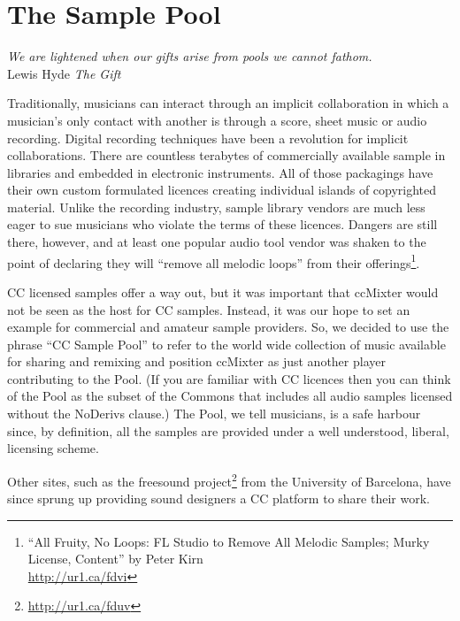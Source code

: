 \section{The Sample Pool}
\label{s:unexpected_collaboration:sample_pool}

\begin{flushright}
\textit{We are lightened when our gifts arise from pools we cannot fathom.}\\
Lewis Hyde \textit{The Gift}
\end{flushright}

Traditionally, musicians can interact through an implicit collaboration in which
a musician's only contact with another is through a score, sheet music or audio
recording. Digital recording techniques have been a revolution for implicit
collaborations. There are countless terabytes of commercially available sample
in libraries and embedded in electronic instruments. All of those packagings
have their own custom formulated licences creating individual islands of
copyrighted material. Unlike the recording industry, sample library vendors are
much less eager to sue musicians who violate the terms of these licences.
Dangers are still there, however, and at least one popular audio tool vendor was
shaken to the point of declaring they will ``remove all melodic loops'' from
their of\hbox{}ferings\footnote{``All Fruity, No Loops: FL Studio to Remove All Melodic
Samples; Murky License, Content'' by Peter Kirn\\
\url{http://ur1.ca/fdvi}}.

CC licensed samples of\hbox{}fer a way out, but it was important that ccMixter would
not be seen as the host for CC samples. Instead, it was our hope to set an
example for commercial and amateur sample providers. So, we decided to use the
phrase ``CC Sample Pool'' to refer to the world wide collection of music
available for sharing and remixing and position ccMixter as just another player
contributing to the Pool. (If you are familiar with CC licences then you can
think of the Pool as the subset of the Commons that includes all audio samples
licensed without the NoDerivs clause.) The Pool, we tell musicians, is a safe
harbour since, by def\hbox{}inition, all the samples are provided under a well
understood, liberal, licensing scheme.

Other sites, such as the freesound project\footnote{\url{http://ur1.ca/fduv}} from the University of
Barcelona, have since sprung up providing sound designers a CC platform to share
their work.

